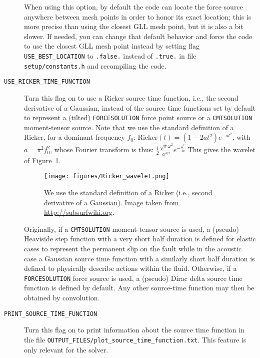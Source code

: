 \begin{description}
When using this option, by default the code can locate the force source
anywhere between mesh points in order to honor its exact location; this
is more precise than using the closest GLL mesh point, but it is also a bit slower.
If needed, you can change that default behavior and force the code to use the closest
GLL mesh point instead by setting flag \texttt{USE\_BEST\_LOCATION} to \texttt{.false.} instead of \texttt{.true.} in file
\texttt{setup/constants.h} and recompiling the code.
\item [{\texttt{USE\_RICKER\_TIME\_FUNCTION}}] Turn this flag on to use
a Ricker source time function, i.e., the second derivative of a Gaussian, instead of the source time functions
set by default to represent a (tilted) \texttt{FORCESOLUTION} force
point source or a \texttt{CMTSOLUTION} moment-tensor source.
Note that we use the standard definition of a Ricker, for a dominant frequency $f_0$:
$\mathrm{Ricker}(t) = (1 - 2 a t^2) e^{-a t^2}$, with $a = \pi^2 f_0^2$,
whose Fourier transform is thus:
$\frac{1}{2} \frac{\sqrt{\pi}\omega^2}{a^{3/2}}e^{-\frac{\omega^2}{4 a}}$
This gives the wavelet of Figure~\ref{fig:RickerWavelet}.
\begin{figure}[htbp]
\centering
\texttt{[image: figures/Ricker\_wavelet.png]}
\caption{We use the standard definition of a Ricker (i.e., second derivative of a Gaussian). Image taken from \url{http://subsurfwiki.org}.}
\label{fig:RickerWavelet}
\end{figure}
Originally, if a \texttt{CMTSOLUTION} moment-tensor source is used, a (pseudo)
Heaviside step function with a very short half duration is defined
for elastic cases to represent the permanent slip on the fault while
in the acoustic case a Gaussian source time function with a similarly
short half duration is defined to physically describe actions within
the fluid. Otherwise, if a \texttt{FORCESOLUTION} force source is
used, a (pseudo) Dirac delta source time function is defined by default.
Any other source-time function may then be obtained by convolution.
\item [{\texttt{PRINT\_SOURCE\_TIME\_FUNCTION}}] Turn this flag on to print
information about the source time function in the file \texttt{OUTPUT\_FILES/plot\_source\_time\_function.txt}.
This feature is only relevant for the solver.
%
\end{description}

